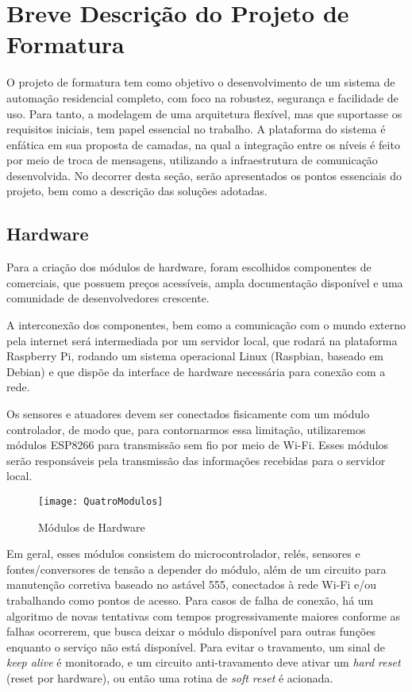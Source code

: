 \chapter{Breve Descrição do Projeto de Formatura}

O projeto de formatura tem como objetivo o desenvolvimento de um sistema de automação residencial completo, com foco na robustez, segurança e facilidade de uso. Para tanto, a modelagem de uma arquitetura flexível, mas que suportasse os requisitos iniciais, tem papel essencial no trabalho. A plataforma do sistema é enfática em sua proposta de camadas, na qual a integração entre os níveis é feito por meio de troca de mensagens, utilizando a infraestrutura de comunicação desenvolvida. No decorrer desta seção, serão apresentados os pontos essenciais do projeto, bem como a descrição das soluções adotadas.

\section{Hardware}

Para a criação dos módulos de hardware, foram escolhidos componentes de \wiot{} comerciais, que possuem preços acessíveis, ampla documentação disponível e uma comunidade de desenvolvedores crescente.

A interconexão dos componentes, bem como a comunicação com o mundo externo pela internet será intermediada por um servidor local, que rodará na plataforma Raspberry Pi, rodando um sistema operacional Linux (Raspbian, baseado em Debian) e que dispõe da interface de hardware necessária para conexão com a rede.

Os sensores e atuadores devem ser conectados fisicamente com um módulo controlador, de modo que, para contornarmos essa limitação, utilizaremos módulos ESP8266 para transmissão sem fio por meio de Wi-Fi. Esses módulos serão responsáveis pela transmissão das informações recebidas para o servidor local. 

\begin{figure}[htb]
	\caption{\label{fig:QuatroModulos}Módulos de Hardware}
	\begin{center}
		\texttt{[image: QuatroModulos]}
	\end{center}
\end{figure}

Em geral, esses módulos consistem do microcontrolador, relés, sensores e fontes/conversores de tensão a depender do módulo, além de um circuito para manutenção corretiva baseado no astável 555, conectados à rede Wi-Fi e/ou trabalhando como pontos de acesso. Para casos de falha de conexão, há um algoritmo de novas tentativas com tempos progressivamente maiores conforme as falhas ocorrerem, que busca deixar o módulo disponível para outras funções enquanto o serviço não está disponível. Para evitar o travamento, um sinal de \textit{keep alive} é monitorado, e um circuito anti-travamento deve ativar um \textit{hard reset} (reset por hardware), ou então uma rotina de \textit{soft reset} é acionada.


